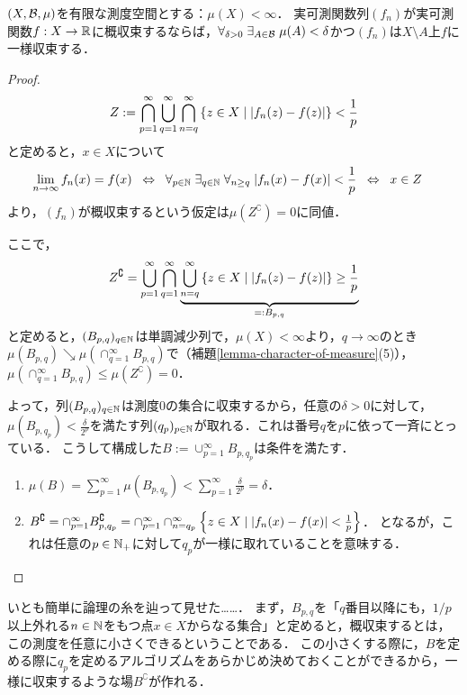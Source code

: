 \documentclass[uplatex, dvipdfmx]{jsreport}
\begin{document}
\begin{theorem}[Egorov (1911)]\label{thm-Egorov}
    $(X,\mathcal{B},\mu)$を有限な測度空間とする：$\mu(X)<\infty$．
    実可測関数列$(f_n)$が実可測関数$f:X\to\mathbb{R}$に概収束するならば，$\forall_{\delta>0}\;\exists_{A\in\mathcal{B}}\;\mu(A)<\delta$かつ$(f_n)$は$X\setminus A$上$f$に一様収束する．
\end{theorem}
\begin{proof}
    \[Z:=\bigcap^\infty_{p=1}\bigcup_{q=1}^\infty\bigcap^\infty_{n=q}\left\{z\in X\mid \lvert f_n(z)-f(z)\rvert\right\}<\frac{1}{p}\]
    と定めると，$x\in X$について
    \begin{align*}
        \lim_{n\to\infty}f_n(x)=f(x)&\;\;\Leftrightarrow\;\; \forall_{p\in\mathbb{N}}\;\exists_{q\in\mathbb{N}}\;\forall_{n\ge q}\;\lvert f_n(x)-f(x)\rvert<\frac{1}{p}\;\;\Leftrightarrow\;\; x\in Z
    \end{align*}
    より，$(f_n)$が概収束するという仮定は$\mu(Z^\complement)=0$に同値．

    ここで，
    \[Z^\complement=\bigcup^\infty_{p=1}\bigcap_{q=1}^\infty\underbrace{\bigcup^\infty_{n=q}\left\{z\in X\mid \lvert f_n(z)-f(z)\rvert\right\}\ge\frac{1}{p}}_{=:B_{p,q}}\]
    と定めると，$(B_{p,q})_{q\in\mathbb{N}}$は単調減少列で，$\mu(X)<\infty$より，$q\to\infty$のとき$\mu(B_{p,q})\searrow \mu(\cap^\infty_{q=1}B_{p,q})$で（補題\ref{lemma-character-of-measure}(5)），
    $\mu(\cap^\infty_{q=1}B_{p,q})\le\mu(Z^\complement)=0$．

    よって，列$(B_{p,q})_{q\in\mathbb{N}}$は測度$0$の集合に収束するから，任意の$\delta>0$に対して，
    $\mu(B_{p,q_p})<\frac{\delta}{2^p}$を満たす列$(q_p)_{p\in\mathbb{N}}$が取れる．これは番号$q$を$p$に依って一斉にとっている．
    こうして構成した$B:=\cup^\infty_{p=1}B_{p,q_p}$は条件を満たす．
    \begin{enumerate}
        \item $\mu(B)=\sum^\infty_{p=1}\mu(B_{p,q_p})<\sum^\infty_{p=1}\frac{\delta}{2^p}=\delta$．
        \item $B^\complement=\cap^\infty_{p=1}B^\complement_{p,q_p}=\cap^\infty_{p=1}\cap^\infty_{n=q_p}\left\{z\in X\mid \lvert f_n(x)-f(x)\rvert<\frac{1}{p}\right\}$．
        となるが，これは任意の$p\in\mathbb{N}_+$に対して$q_p$が一様に取れていることを意味する．
    \end{enumerate}
\end{proof}
\begin{remarks}
    いとも簡単に論理の糸を辿って見せた……．
    まず，$B_{p,q}$を「$q$番目以降にも，$1/p$以上外れる$n\in\mathbb{N}$をもつ点$x\in X$からなる集合」と定めると，概収束するとは，この測度を任意に小さくできるということである．
    この小さくする際に，$B$を定める際に$q_p$を定めるアルゴリズムをあらかじめ決めておくことができるから，一様に収束するような場$B^\complement$が作れる．
\end{remarks}
\end{document}
